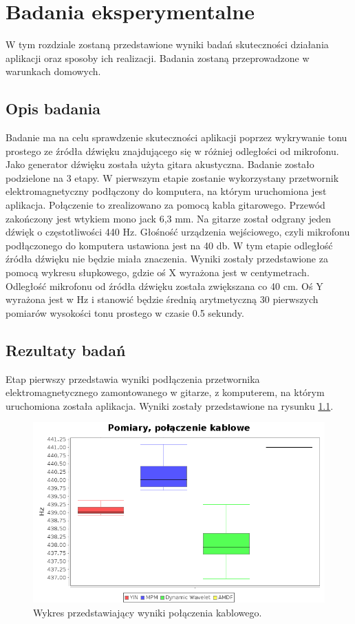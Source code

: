 \chapter{Badania eksperymentalne}
\label{chapter:rezultaty}

W tym rozdziale zostaną przedstawione wyniki badań skuteczności działania aplikacji oraz sposoby ich realizacji. Badania zostaną przeprowadzone w warunkach domowych.

\section{Opis badania}

Badanie ma na celu sprawdzenie skuteczności aplikacji poprzez wykrywanie tonu prostego ze źródła dźwięku znajdującego się w różniej odległości od mikrofonu. Jako generator dźwięku została użyta gitara akustyczna. Badanie zostało podzielone na 3 etapy. W pierwszym etapie zostanie wykorzystany przetwornik elektromagnetyczny podłączony do komputera, na którym uruchomiona jest aplikacja. Połączenie to zrealizowano za pomocą kabla gitarowego. Przewód zakończony jest wtykiem mono jack 6,3 mm. Na gitarze został odgrany jeden dźwięk o częstotliwości 440 Hz. Głośność urządzenia wejściowego, czyli mikrofonu podłączonego do komputera ustawiona jest na 40 db. W tym etapie odległość źródła dźwięku nie będzie miała znaczenia. Wyniki zostały przedstawione za pomocą wykresu słupkowego, gdzie oś X wyrażona jest w centymetrach. Odległość mikrofonu od źródła dźwięku została zwiększana co 40 cm. Oś Y wyrażona jest w  Hz i stanowić będzie średnią arytmetyczną 30 pierwszych pomiarów wysokości tonu prostego w czasie 0.5 sekundy. 

\section{Rezultaty badań}

Etap pierwszy przedstawia wyniki podłączenia przetwornika elektromagnetycznego zamontowanego w gitarze, z komputerem, na którym uruchomiona została aplikacja. Wyniki zostały przedstawione na rysunku \ref{kabel}.


\begin{figure}[h!]
  \centering
  \includegraphics[width=0.9\linewidth]{rys/BoxPlots/kabel}
  \caption{Wykres przedstawiający wyniki połączenia kablowego.}
  \label{kabel}
\end{figure}





